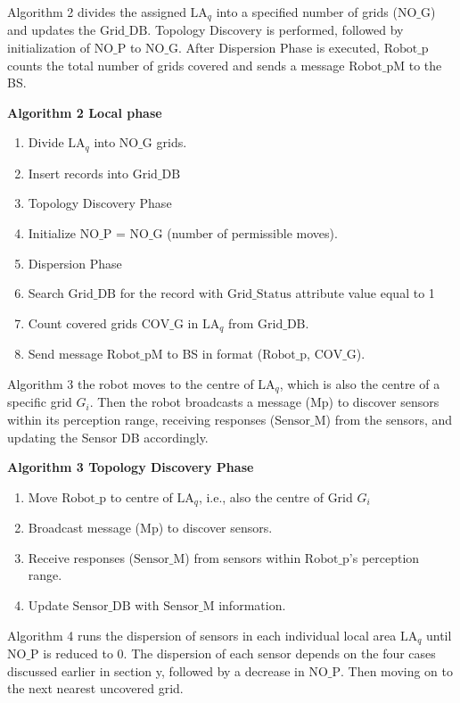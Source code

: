 \documentclass{article}
\begin{document}
Algorithm 2 divides the assigned $\text{LA}_q$ into a specified number of grids ($\text{NO\_G}$) and updates the $\text{Grid\_DB}$. Topology Discovery is performed, followed by initialization of $\text{NO\_P}$ to $\text{NO\_G}$. After Dispersion Phase is executed, $\text{Robot\_p}$ counts the total number of grids covered and sends a message $\text{Robot\_pM}$ to the BS.

\noindent\textbf{Algorithm 2 Local phase}
\begin{enumerate}[label=\arabic*:]
    \item Divide $\text{LA}_q$ into $\text{NO\_G}$ grids.
    \item Insert records into $\text{Grid\_DB}$
    \item Topology Discovery Phase
    \item Initialize $\text{NO\_P}$ = $\text{NO\_G}$ (number of permissible moves).
    \item Dispersion Phase
    \item Search $\text{Grid\_DB}$ for the record with $\text{Grid\_Status}$ attribute value equal to 1
    \item Count covered grids $\text{COV\_G}$ in $\text{LA}_q$ from $\text{Grid\_DB}$.
    \item Send message $\text{Robot\_pM}$ to BS in format ($\text{Robot\_p}$, $\text{COV\_G}$).
\end{enumerate}

Algorithm 3 the robot moves to the centre of $\text{LA}_q$, which is also the centre of a specific grid $G_i$. Then the robot broadcasts a message (Mp) to discover sensors within its perception range, receiving responses ($\text{Sensor\_M}$) from the sensors, and updating the Sensor DB accordingly.

\noindent\textbf{Algorithm 3 Topology Discovery Phase}
\begin{enumerate}[label=\arabic*:]
    \item Move $\text{Robot\_p}$ to centre of $\text{LA}_q$, i.e., also the centre of Grid $G_i$
    \item Broadcast message (Mp) to discover sensors.
    \item Receive responses ($\text{Sensor\_M}$) from sensors within $\text{Robot\_p}$’s perception range.
    \item Update $\text{Sensor\_DB}$ with $\text{Sensor\_M}$ information.
\end{enumerate}

Algorithm 4 runs the dispersion of sensors in each individual local area $\text{LA}_q$ until $\text{NO\_P}$ is reduced to 0. The dispersion of each sensor depends on the four cases discussed earlier in section y, followed by a decrease in $\text{NO\_P}$. Then moving on to the next nearest uncovered grid.
\end{document}
